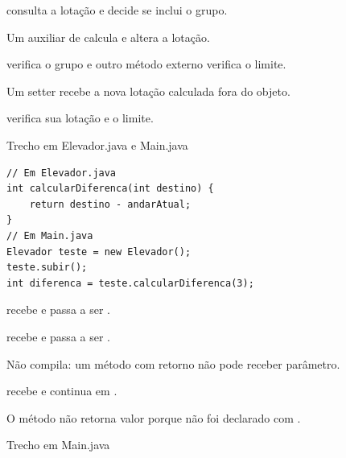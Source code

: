 \documentclass[11pt,a4paper]{article}
\begin{document}
\begin{minipage}[t]{.485\textwidth}
\begin{alternativas}
\item {} consulta a lotação e decide se inclui o grupo.
\item Um auxiliar de  calcula e altera a lotação.
\item {} verifica o grupo e outro método externo verifica o limite.
\item Um setter recebe a nova lotação calculada fora do objeto.
\item {} verifica sua lotação e o limite.
\end{alternativas}
\begin{painelEvolucao}{Trecho em Elevador.java e Main.java}
\begin{lstlisting}[style=questaocodigo]
// Em Elevador.java
int calcularDiferenca(int destino) {
    return destino - andarAtual;
}
// Em Main.java
Elevador teste = new Elevador();
teste.subir();
int diferenca = teste.calcularDiferenca(3);
\end{lstlisting}
\end{painelEvolucao}
\begin{alternativas}
\item {} recebe  e  passa a ser .
\item {} recebe  e  passa a ser .
\item Não compila: um método com retorno  não pode receber parâmetro.
\item {} recebe  e  continua em .
\item O método não retorna valor porque não foi declarado com .
\end{alternativas}
\begin{painelEvolucao}{Trecho em Main.java}

\end{painelEvolucao}
\end{minipage}
\end{document}
